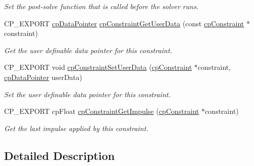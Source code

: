 \begin{DoxyCompactItemize}
\begin{DoxyCompactList}\small\item\em Set the post-\/solve function that is called before the solver runs. \end{DoxyCompactList}\item 
\mbox{\label{group__cpConstraint_gaf81f9f4d9d420c5746ad722c04c8388a}} 
C\+P\+\_\+\+E\+X\+P\+O\+RT \hyperlink{group__basicTypes_ga2ac2c3c31e21893941f9e4f8ee279447}{cp\+Data\+Pointer} \hyperlink{group__cpConstraint_gaf81f9f4d9d420c5746ad722c04c8388a}{cp\+Constraint\+Get\+User\+Data} (const \hyperlink{structcpConstraint}{cp\+Constraint} $\ast$constraint)
\begin{DoxyCompactList}\small\item\em Get the user definable data pointer for this constraint. \end{DoxyCompactList}\item 
\mbox{\label{group__cpConstraint_ga3dc0f22f04eb955f16b11212a9e8b37f}} 
C\+P\+\_\+\+E\+X\+P\+O\+RT void \hyperlink{group__cpConstraint_ga3dc0f22f04eb955f16b11212a9e8b37f}{cp\+Constraint\+Set\+User\+Data} (\hyperlink{structcpConstraint}{cp\+Constraint} $\ast$constraint, \hyperlink{group__basicTypes_ga2ac2c3c31e21893941f9e4f8ee279447}{cp\+Data\+Pointer} user\+Data)
\begin{DoxyCompactList}\small\item\em Set the user definable data pointer for this constraint. \end{DoxyCompactList}\item 
\mbox{\label{group__cpConstraint_ga742285346b076309fc021eed1af34483}} 
C\+P\+\_\+\+E\+X\+P\+O\+RT cp\+Float \hyperlink{group__cpConstraint_ga742285346b076309fc021eed1af34483}{cp\+Constraint\+Get\+Impulse} (\hyperlink{structcpConstraint}{cp\+Constraint} $\ast$constraint)
\begin{DoxyCompactList}\small\item\em Get the last impulse applied by this constraint. \end{DoxyCompactList}\end{DoxyCompactItemize}


\subsection{Detailed Description}


